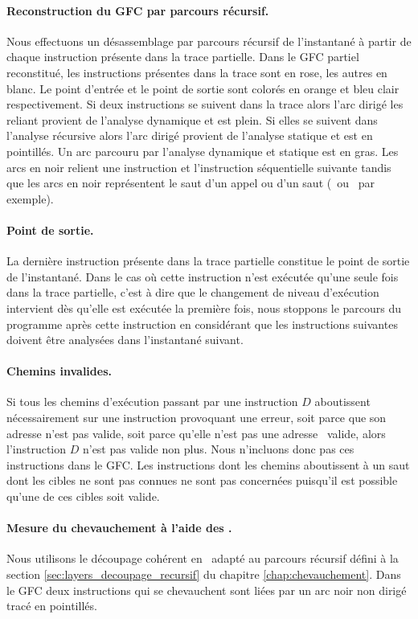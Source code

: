 \paragraph{Reconstruction du GFC par parcours récursif.}
Nous effectuons un désassemblage par parcours récursif de l'instantané à partir de chaque instruction présente dans la trace partielle.
Dans le GFC partiel reconstitué, les instructions présentes dans la trace sont en rose, les autres en blanc. Le point d'entrée et le point de sortie sont colorés en orange et bleu clair respectivement.
Si deux instructions se suivent dans la trace alors l'arc dirigé les reliant provient de l'analyse dynamique et est plein. Si elles se suivent dans l'analyse récursive alors l'arc dirigé provient de l'analyse statique et est en pointillés. Un arc parcouru par l'analyse dynamique et statique est en gras. Les arcs en noir relient une instruction et l'instruction séquentielle suivante tandis que les arcs en noir représentent le saut d'un appel ou d'un saut (\call\ ou \jmp\ par exemple).

\paragraph{Point de sortie.}
La dernière instruction présente dans la trace partielle constitue le point de sortie de l'instantané.
Dans le cas où cette instruction n'est exécutée qu'une seule fois dans la trace partielle, c'est à dire que le changement de niveau d'exécution intervient dès qu'elle est exécutée la première fois, nous stoppons le parcours du programme après cette instruction en considérant que les instructions suivantes doivent être analysées dans l'instantané suivant.

\paragraph{Chemins invalides.}
Si tous les chemins d'exécution passant par une instruction $D$ aboutissent nécessairement sur une instruction provoquant une erreur, soit parce que son adresse n'est pas valide, soit parce qu'elle n'est pas une adresse \xq\ valide, alors l'instruction $D$ n'est pas valide non plus.
Nous n'incluons donc pas ces instructions dans le GFC.
Les instructions dont les chemins aboutissent à un saut dont les cibles ne sont pas connues ne sont pas concernées puisqu'il est possible qu'une de ces cibles soit valide.


\paragraph{Mesure du chevauchement à l'aide des \layers.}
Nous utilisons le découpage cohérent en \layers\ adapté au parcours récursif défini à la section \ref{sec:layers_decoupage_recursif} du chapitre \ref{chap:chevauchement}.
Dans le GFC deux instructions qui se chevauchent sont liées par un arc noir non dirigé tracé en pointillés.


